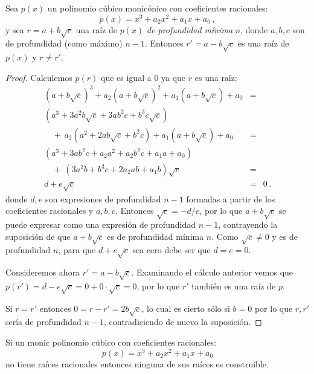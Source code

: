 \begin{theorem}\label{thm.trisect.conjugate}
Sea $p(x)$ un polinomio cúbico monicónico con coeficientes racionales:
\[
p(x)=x^3+a_2x^2+a_1x+a_0\,,
\]
y sea $r=a+b\sqrt{c}$ una raíz de $p(x)$ \emph{de profundidad mínima} $n$, donde $a,b,c$ son de profundidad (como máximo) $n-1$. Entonces $r'=a-b\sqrt{c}$ es una raíz de $p(x)$ y $r\neq r'$.
\end{theorem}

\begin{proof}
Calculemos $p(r)$ que es igual a $0$ ya que $r$ es una raíz:
\[
\renewcommand{\arraystretch}{1.4}
\begin{array}{lcr}
(a+b\sqrt{c})^3+a_2(a+b\sqrt{c})^2+a_1(a+b\sqrt{c})+a_0&=\\
(a^3+3a^2b\sqrt{c}+3ab^2c+b^3c\sqrt{c})\\
\quad+\,a_2(a^2+2ab\sqrt{c}+b^2c) +a_1(a+b\sqrt{c}) +a_0&=\\
(a^3+3ab^2c+a_2a^2+a_2b^2c+a_1a+a_0)\\
\quad+\,(3a^2b+b^3c+2a_2ab+a_1b)\sqrt{c}&=\\
d+e\sqrt{c}&=&0\,.
\end{array}
\]
donde $d,e$ son expresiones de profundidad $n-1$ formadas a partir de los coeficientes racionales y $a,b,c$. Entonces $\sqrt{c}=-d/e$, por lo que $a+b\sqrt{c}$ se puede expresar como una expresión de profundidad $n-1$, contrayendo la suposición de que $a+b\sqrt{c}$ es de profundidad mínima $n$. Como $\sqrt{c}\neq 0$ y es de profundidad $n$, para que $d+e\sqrt{c}$ sea cero debe ser que $d=e=0$.

Consideremos ahora $r'=a-b\sqrt{c}$. Examinando el cálculo anterior vemos que $p(r')=d-e\sqrt{c}=0+0\cdot\sqrt{c}=0$, por lo que $r'$ también es una raíz de $p$.

Si $r= r'$ entonces $0=r-r'=2b\sqrt{c}$, lo cual es cierto sólo si $b=0$ por lo que $r,r'$ sería de profundidad $n-1$, contradiciendo de nuevo la suposición.
\end{proof}                                

\begin{theorem}
Si un monic polinomio cúbico con coeficientes racionales:
\[p(x)=x^3+a_2x^2+a_1x+a_0\] no tiene raíces racionales entonces ninguna de sus raíces es construible.
\end{theorem}

